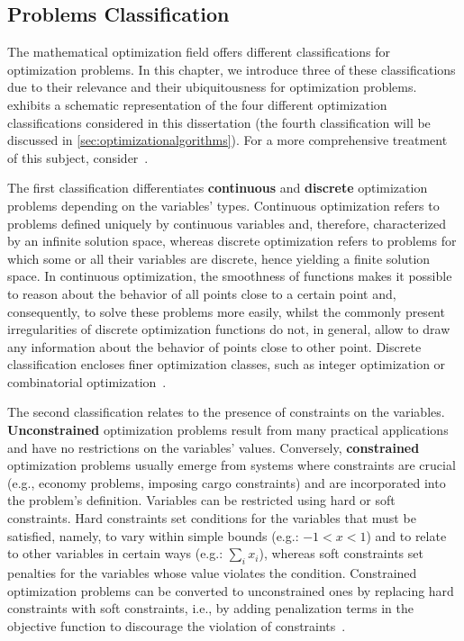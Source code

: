 	
\subsection{Problems Classification}
	
	The mathematical optimization field offers different classifications for optimization problems. In this chapter, we introduce three of these classifications due to their relevance and their ubiquitousness for optimization problems.  exhibits a schematic representation of the four different optimization classifications considered in this dissertation (the fourth classification will be discussed in \cref{sec:optimizationalgorithms}). For a more comprehensive treatment of this subject, consider~\cite{Nemhauser1988,Nocedal2011NumericalOptimization}. 
	 
	The first classification differentiates \textbf{continuous} and \textbf{discrete} optimization problems depending on the variables' types. Continuous optimization refers to problems defined uniquely by continuous variables and, therefore, characterized by an infinite solution space, whereas discrete optimization refers to problems for which some or all their variables are discrete, hence yielding a finite solution space. In continuous optimization, the smoothness of functions makes it possible to reason about the behavior of all points close to a certain point and, consequently, to solve these problems more easily, whilst the commonly present irregularities of discrete optimization functions do not, in general, allow to draw any information about the behavior of points close to other point. Discrete classification encloses finer optimization classes, such as integer optimization or combinatorial optimization~\cite{Nemhauser1988}. 
	
	The second classification relates to the presence of constraints on the variables. \textbf{Unconstrained} optimization problems result from many practical applications and have no restrictions on the variables' values. Conversely, \textbf{constrained} optimization problems usually emerge from systems where constraints are crucial (e.g., economy problems, imposing cargo constraints) and are incorporated into the problem's definition. Variables can be restricted using hard or soft constraints. Hard constraints set conditions for the variables that must be satisfied, namely, to vary within simple bounds (e.g.: $-1<x<1$) and to relate to other variables in certain ways (e.g.: $\sum_{i} x_i$), whereas soft constraints set penalties for the variables whose value violates the condition. Constrained optimization problems can be converted to unconstrained ones by replacing hard constraints with soft constraints, i.e., by adding penalization terms in the objective function to discourage the violation of constraints~\cite{Nocedal2011NumericalOptimization}. 
	
